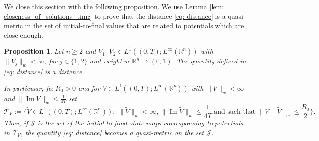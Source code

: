 \documentclass[10pt,a4paper]{amsart}
\newtheorem{proposition}{Proposition}[section]
\theoremstyle{remark}
\theoremstyle{definition}
\newcommand{\R}{\mathbb{R}}
\def\Im{\mathop\mathrm{Im}}
\def\cal{\mathcal}
\def\wt{\widetilde}
\begin{document}
We close this section with the following proposition. We use Lemma \ref{lem: closeness_of_solutions_time} to prove that the distance \eqref{eq: distance} is a quasi-metric in the set of initial-to-final values that are related to potentials which are close enough.



\begin{proposition}\label{prop: distance}
Let $n\geq 2$ and $V_1, \, V_2 \in L^1((0, T); L^\infty(\R^n))$ with $\| V_j \|_w < \infty$, for $j\in\{1, 2\}$ and weight $w:\R^n \to (0, 1)$. The quantity defined in \eqref{eq: distance} is a distance. 

In particular, fix $R_0>0$ and for $V \in L^1((0, T); L^\infty(\R^n))$ with $\| V \|_w < \infty$ and $\| \Im {V} \|_w\leq \frac{1}{4T}$ set 
%
\[
\cal {T}_V := \{\wt{ V} \in  L^1((0, T); L^\infty(\R^n)) : \,\, \| \wt{V} \|_w<\infty, \, \| \Im \wt{V} \|_w \leq \frac{1}{4T} \,\,
%
\text{and such that} \,\, 
%
\| V - \wt{V} \|_w \leq \frac{R_0}{2} \}.
\]
%
Then, if $\cal J$ is the set of the initial-to-final-state maps corresponding to potentials in $ \cal T_V$, the quantity \eqref{eq: distance} becomes a quasi-metric on the set $\cal J$.
\end{proposition}
\end{document}
